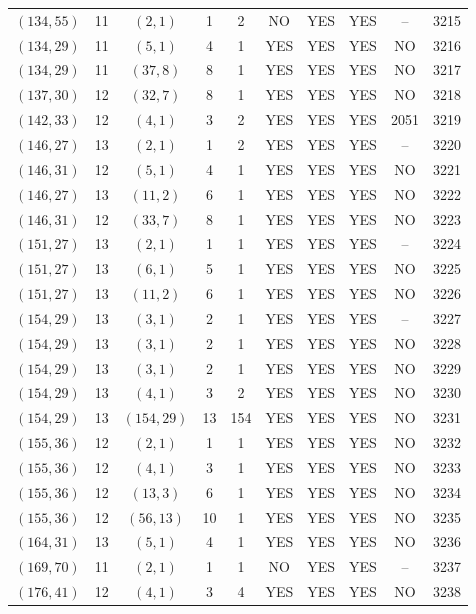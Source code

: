 \begin{longtable}{|c|c|c|c|c|c|c|c|c|c|}
$(134, 55)$ & 11 & $(2, 1)$ & 1 & 2 & NO & YES & YES & -- & 3215\\
$(134, 29)$ & 11 & $(5, 1)$ & 4 & 1 & YES & YES & YES & NO & 3216\\
$(134, 29)$ & 11 & $(37, 8)$ & 8 & 1 & YES & YES & YES & NO & 3217\\
$(137, 30)$ & 12 & $(32, 7)$ & 8 & 1 & YES & YES & YES & NO & 3218\\
$(142, 33)$ & 12 & $(4, 1)$ & 3 & 2 & YES & YES & YES & 2051 & 3219\\
$(146, 27)$ & 13 & $(2, 1)$ & 1 & 2 & YES & YES & YES & -- & 3220\\
$(146, 31)$ & 12 & $(5, 1)$ & 4 & 1 & YES & YES & YES & NO & 3221\\
$(146, 27)$ & 13 & $(11, 2)$ & 6 & 1 & YES & YES & YES & NO & 3222\\
$(146, 31)$ & 12 & $(33, 7)$ & 8 & 1 & YES & YES & YES & NO & 3223\\
$(151, 27)$ & 13 & $(2, 1)$ & 1 & 1 & YES & YES & YES & -- & 3224\\
$(151, 27)$ & 13 & $(6, 1)$ & 5 & 1 & YES & YES & YES & NO & 3225\\
$(151, 27)$ & 13 & $(11, 2)$ & 6 & 1 & YES & YES & YES & NO & 3226\\
$(154, 29)$ & 13 & $(3, 1)$ & 2 & 1 & YES & YES & YES & -- & 3227\\
$(154, 29)$ & 13 & $(3, 1)$ & 2 & 1 & YES & YES & YES & NO & 3228\\
$(154, 29)$ & 13 & $(3, 1)$ & 2 & 1 & YES & YES & YES & NO & 3229\\
$(154, 29)$ & 13 & $(4, 1)$ & 3 & 2 & YES & YES & YES & NO & 3230\\
$(154, 29)$ & 13 & $(154, 29)$ & 13 & 154 & YES & YES & YES & NO & 3231\\
$(155, 36)$ & 12 & $(2, 1)$ & 1 & 1 & YES & YES & YES & NO & 3232\\
$(155, 36)$ & 12 & $(4, 1)$ & 3 & 1 & YES & YES & YES & NO & 3233\\
$(155, 36)$ & 12 & $(13, 3)$ & 6 & 1 & YES & YES & YES & NO & 3234\\
$(155, 36)$ & 12 & $(56, 13)$ & 10 & 1 & YES & YES & YES & NO & 3235\\
$(164, 31)$ & 13 & $(5, 1)$ & 4 & 1 & YES & YES & YES & NO & 3236\\
$(169, 70)$ & 11 & $(2, 1)$ & 1 & 1 & NO & YES & YES & -- & 3237\\
$(176, 41)$ & 12 & $(4, 1)$ & 3 & 4 & YES & YES & YES & NO & 3238\\

\end{longtable}
